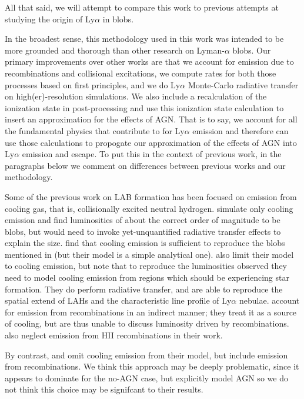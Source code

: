All that said, we will attempt to compare this work to previous attempts at studying the origin of Ly$\alpha$ in blobs.

In the broadest sense, this methodology used in this work was intended to be more grounded and thorough than other research on Lyman-$\alpha$ blobs.
Our primary improvements over other works are that we account for emission due to recombinations and collisional excitations, we compute rates for both those processes based on first principles, and we do Ly$\alpha$ Monte-Carlo radiative transfer on high(er)-resolution simulations.
We also include a recalculation of the ionization state in post-processing and use this ionization state calculation to insert an approximation for the effects of AGN.
That is to say, we account for all the fundamental physics that contribute to for Ly$\alpha$ emission and therefore can use those calculations to propogate our approximation of the effects of AGN into Ly$\alpha$ emission and escape.
To put this in the context of previous work, in the paragraphs below we comment on differences between previous works and our methodology.

Some of the previous work on LAB formation has been focused on emission from cooling gas, that is, collisionally excited neutral hydrogen.
\citet{Fardal2001} simulate only cooling emission and find luminosities of about the correct order of magnitude to be blobs, but would need to invoke yet-unquantified radiative transfer effects to explain the size.
\citet{Haiman2000} find that cooling emission is sufficient to reproduce the blobs mentioned in \citet{Steidel2000} (but their model is a simple analytical one).
\citet{Faucher-Giguere2010} also limit their model to cooling emission, but note that to reproduce the luminosities observed they need to model cooling emission from regions which should be experiencing star formation.
They do perform radiative transfer, and are able to reproduce the spatial extend of LAHs and the characteristic line profile of Ly$\alpha$ nebulae.
\citet{Rosdahl2012} account for emission from recombinations in an indirect manner; they treat it as a source of cooling, but are thus unable to discuss luminosity driven by recombinations.
\citet{Goerdt2010} also neglect emission from HII recombinations in their work.

By contrast, \citet{Cantalupo2005} and \citet{Gronke2017} omit cooling emission from their model, but include emission from recombinations.
We think this approach may be deeply problematic, since it appears to dominate for the no-AGN case, but \citet{Gronke2017} explicitly model AGN so we do not think this choice may be signifcant to their results.

